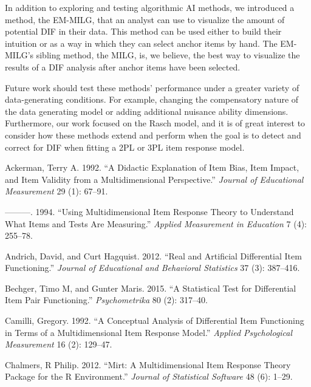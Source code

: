 \documentclass[
  11pt,
]{article}
\begin{document}
In addition to exploring and testing algorithmic AI methods, we introduced a method, the EM-MILG, that an analyst can use to visualize the amount of potential DIF in their data. This method can be used either to build their intuition or as a way in which they can select anchor items by hand. The EM-MILG's sibling method, the MILG, is, we believe, the best way to visualize the results of a DIF analysis after anchor items have been selected.

Future work should test these methods' performance under a greater variety of data-generating conditions. For example, changing the compensatory nature of the data generating model or adding additional nuisance ability dimensions. Furthermore, our work focused on the Rasch model, and it is of great interest to consider how these methods extend and perform when the goal is to detect and correct for DIF when fitting a 2PL or 3PL item response model.

\clearpage




\hypertarget{refs}{}
\leavevmode\hypertarget{ref-ackerman1992didactic}{}%
Ackerman, Terry A. 1992. ``A Didactic Explanation of Item Bias, Item Impact, and Item Validity from a Multidimensional Perspective.'' \emph{Journal of Educational Measurement} 29 (1): 67--91.

\leavevmode\hypertarget{ref-ackerman1994using}{}%
---------. 1994. ``Using Multidimensional Item Response Theory to Understand What Items and Tests Are Measuring.'' \emph{Applied Measurement in Education} 7 (4): 255--78.

\leavevmode\hypertarget{ref-andrich2012real}{}%
Andrich, David, and Curt Hagquist. 2012. ``Real and Artificial Differential Item Functioning.'' \emph{Journal of Educational and Behavioral Statistics} 37 (3): 387--416.

\leavevmode\hypertarget{ref-bechger2015statistical}{}%
Bechger, Timo M, and Gunter Maris. 2015. ``A Statistical Test for Differential Item Pair Functioning.'' \emph{Psychometrika} 80 (2): 317--40.

\leavevmode\hypertarget{ref-camilli1992conceptual}{}%
Camilli, Gregory. 1992. ``A Conceptual Analysis of Differential Item Functioning in Terms of a Multidimensional Item Response Model.'' \emph{Applied Psychological Measurement} 16 (2): 129--47.

\leavevmode\hypertarget{ref-chalmers2012mirt}{}%
Chalmers, R Philip. 2012. ``Mirt: A Multidimensional Item Response Theory Package for the R Environment.'' \emph{Journal of Statistical Software} 48 (6): 1--29.
\end{document}
